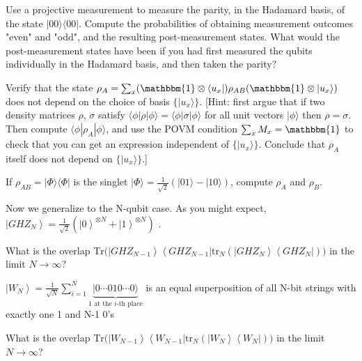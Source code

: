 \documentclass[a4paper,10pt,landscape,twocolumn]{scrartcl}
\newcommand{\ket}[1]{| #1 \rangle}
\newcommand{\bra}[1]{\langle #1 |}
\newcommand{\proj}[1]{| #1 \rangle \langle #1 |}
\begin{document}
\begin{exercise}
Use a projective measurement to measure the parity, in the Hadamard basis, of
the state $\proj{00}$. Compute the probabilities of obtaining measurement outcomes "even" and
"odd", and the resulting post-measurement states. What would the post-measurement states have
been if you had first measured the qubits individually in the Hadamard basis, and then taken the
parity?
\end{exercise}

\begin{exercise}
Verify that the state $\rho_A=\sum_x (\mathbbm{1}\otimes \bra{u_x})\rho_{AB}(\mathbbm{1}\otimes \ket{u_x})$ does not depend on the choice of
basis $\{\ket{u_x}\}$. [Hint: first argue that if two density matrices $\rho$, $\sigma$ satisfy $\bra{\phi}\rho\ket{\phi}=\bra{\phi}\sigma\ket{\phi}$ 
for all unit vectors $\ket{\phi}$ then $\rho=\sigma$. Then compute $\bra{\phi}\rho_A\ket{\phi}$, and use the POVM condition
$\sum_x M_x=\mathbbm{1}$ to check that you can get an expression independent of $\{\ket{u_x}\}$. Conclude that $\rho_A$
itself does not depend on $\{\ket{u_x}\}$.]
\end{exercise}

\begin{exercise}
If $\rho_{AB}=\proj{\Phi}$ is the singlet $\ket{\Phi}=\frac{1}{\sqrt{2}}\left( \ket{01}-\ket{10} \right)$, compute $\rho_A$ and $\rho_B$.
\end{exercise}



\begin{exercise}
\begin{subex}
 Now we generalize to the N-qubit case. As you might expect, $\left| GHZ_ N \right\rangle =\frac{1}{\sqrt {2}} (\left| 0 \right\rangle ^{\otimes N}+\left| 1 \right\rangle ^{\otimes N})$ .

What is the overlap $\text {Tr}\Big(\left| GHZ_{N-1} \right\rangle\left\langle {GHZ_{N-1}}\right| \text {tr}_ N\left(\left| GHZ_ N \right\rangle \left\langle GHZ_ N \right|\right)\Big)$ in the limit $N \rightarrow \infty$? 
\end{subex}

\begin{subex}
$\left| W_ N \right\rangle= \frac{1}{\sqrt{N}}\sum_{i=1}^N \underset{1\text{ at the $i$-th place}}{\underbrace{\ket{0\cdots 010\cdots 0}}}$ is an equal superposition of all N-bit strings with exactly one 1 and N-1 0's

What is the overlap $\text {Tr}\Big(\left| W_{N-1} \right\rangle \left\langle {W_{N-1}}\right| \text {tr}_ N\left(\left| W_ N \right\rangle \left\langle W_N \right|\right)\Big)$ in the limit $N \rightarrow \infty$? 
\end{subex}
\end{exercise}
\end{document}
